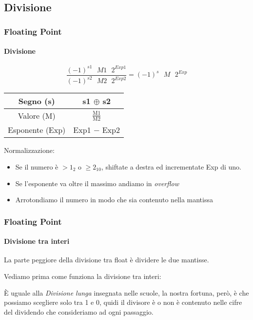 \documentclass{beamer}
\begin{document}
	\subsection{Divisione}
  \begin{frame}
    \frametitle{Floating Point}
    \framesubtitle{Divisione}       
    
    $$\frac{(-1)^{s1} \text{ } M1 \text{ } 2^{Exp1}}{(-1)^{s2} \text{ } M2 \text{ } 2^{Exp2}}= (-1)^{s} \text{ } M \text{ } 2^{Exp}$$
  	
  		\begin{center}
  			\begin{tabular}{|cc|}
  			\hline 
  			Segno (s) & s1 $\oplus$ s2 \\ 
  			\hline 
  			Valore (M) & $\frac{\text{M1}}{\text{M2}}$ \\ 
  			\hline 
  			Esponente (Exp) & Exp1 $-$ Exp2 \\ 
  			\hline 
  			\end{tabular} 
  		\end{center}
	  
	  \vspace{1em}
	  
	  Normalizzazione:
	  \begin{itemize}
	  		\item Se il numero è $> 1_{2}$ o $\geq 2_{10}$, shiftate a destra ed incrementate Exp di uno.
	  		\item Se l'esponente va oltre il massimo andiamo in \emph{overflow}
	  		\item Arrotondiamo il numero in modo che sia contenuto nella mantissa
	  \end{itemize}

  \end{frame}
  \begin{frame}
    \frametitle{Floating Point}
    \framesubtitle{Divisione tra interi}
    La parte peggiore della divisione tra float è dividere le due mantisse.
		
		\vspace{1em}
		    
    Vediamo prima come funziona la divisione tra interi:

		\vspace{1em}
		
		È uguale alla \emph{Divisione lunga} insegnata nelle scuole, la nostra
		fortuna, però, è che possiamo scegliere solo tra 1 e 0, quidi il divisore
		è o non è contenuto nelle cifre del dividendo che consideriamo ad ogni passaggio.
  \end{frame}
  
\end{document}
